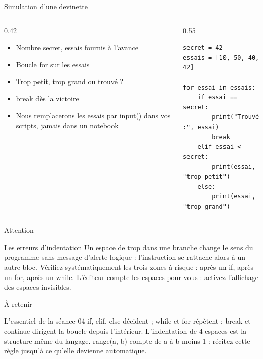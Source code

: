 \documentclass[aspectratio=169,11pt]{beamer}
\begin{document}
\begin{frame}[fragile]{Simulation d'une devinette}
\begin{columns}[t]
\begin{column}{0.42\textwidth}
\begin{itemize}
  \setlength{\itemsep}{1.5pt}\setlength{\parskip}{0pt}
  \item Nombre secret, essais fournis à l'avance
  \item Boucle for sur les essais
  \item Trop petit, trop grand ou trouvé ?
  \item break dès la victoire
  \item Nous remplacerons les essais par input() dans vos scripts, jamais dans un notebook
\end{itemize}
\end{column}
\hspace{0.02\textwidth}
\begin{column}{0.55\textwidth}
\begin{lstlisting}[style=pysmall]
secret = 42
essais = [10, 50, 40, 42]

for essai in essais:
    if essai == secret:
        print("Trouvé :", essai)
        break
    elif essai < secret:
        print(essai, "trop petit")
    else:
        print(essai, "trop grand")
\end{lstlisting}
\end{column}
\end{columns}
\end{frame}

\begin{frame}{Attention}
\begin{alertblock}{Les erreurs d'indentation}
Un espace de trop dans une branche change le sens du programme sans message d'alerte logique : l'instruction se rattache alors à un autre bloc. Vérifiez systématiquement les trois zones à risque : après un if, après un for, après un while. L'éditeur compte les espaces pour vous : activez l'affichage des espaces invisibles.
\end{alertblock}
\end{frame}

\begin{frame}{À retenir}
\begin{block}{L'essentiel de la séance 04}
if, elif, else décident ; while et for répètent ; break et continue dirigent la boucle depuis l'intérieur. L'indentation de 4 espaces est la structure même du langage. range(a, b) compte de a à b moins 1 : récitez cette règle jusqu'à ce qu'elle devienne automatique.
\end{block}
\end{frame}
\end{document}
